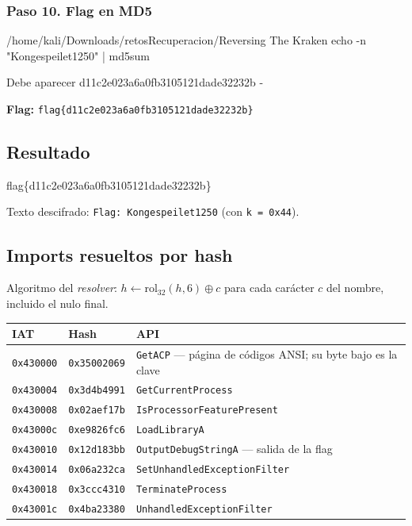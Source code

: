 \documentclass[11pt,a4paper]{article}
\newcommand{\flagbox}[2]{\begin{tcolorbox}[enhanced, colback=flagbg, colframe=green!45!black, boxrule=0.8pt, arc=3pt,
  fonttitle=\bfseries, title={#1}, halign=center]{\Large\ttfamily #2}\end{tcolorbox}}
\begin{document}
\subsubsection*{Paso 10. Flag en MD5}
\begin{comando}{/home/kali/Downloads/retosRecuperacion/Reversing The Kraken}
echo -n "Kongespeilet1250" | md5sum
\end{comando}
\begin{salida}{Debe aparecer}
d11c2e023a6a0fb3105121dade32232b  -
\end{salida}
\begin{nota}\textbf{Flag:} \texttt{flag\{d11c2e023a6a0fb3105121dade32232b\}}\end{nota}


\subsection{Resultado}
\flagbox{Flag de The Kraken}{flag\{d11c2e023a6a0fb3105121dade32232b\}}
Texto descifrado: \texttt{Flag: Kongespeilet1250} (con \texttt{k = 0x44}).

\subsection{Imports resueltos por hash}
Algoritmo del \emph{resolver}: $h \leftarrow \mathrm{rol}_{32}(h, 6) \oplus c$ para cada carácter $c$ del nombre,
incluido el nulo final.

\begin{tabularx}{\linewidth}{@{}llX@{}}
\toprule
\textbf{IAT} & \textbf{Hash} & \textbf{API} \\ \midrule
\texttt{0x430000} & \texttt{0x35002069} & \texttt{GetACP} --- página de códigos ANSI; su byte bajo es la clave \\
\texttt{0x430004} & \texttt{0x3d4b4991} & \texttt{GetCurrentProcess} \\
\texttt{0x430008} & \texttt{0x02aef17b} & \texttt{IsProcessorFeaturePresent} \\
\texttt{0x43000c} & \texttt{0xe9826fc6} & \texttt{LoadLibraryA} \\
\texttt{0x430010} & \texttt{0x12d183bb} & \texttt{OutputDebugStringA} --- salida de la flag \\
\texttt{0x430014} & \texttt{0x06a232ca} & \texttt{SetUnhandledExceptionFilter} \\
\texttt{0x430018} & \texttt{0x3ccc4310} & \texttt{TerminateProcess} \\
\texttt{0x43001c} & \texttt{0x4ba23380} & \texttt{UnhandledExceptionFilter} \\
\bottomrule
\end{tabularx}
\end{document}
